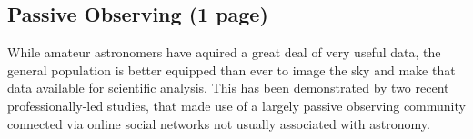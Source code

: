 \documentclass{ar2e}
\begin{document}
\newpage


% 
% 
% 
% 
% 

\subsection{Passive Observing (1 page)}
\label{sec:obs:passive}

While amateur astronomers have aquired a great deal of very useful data, the
general population is better equipped than ever to image the sky and make that
data available for scientific analysis. This has been demonstrated by two
recent professionally-led studies, that made use of a largely passive
observing community connected via online social networks not usually
associated with astronomy. 
\end{document}
